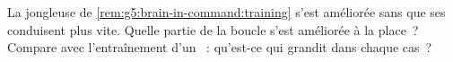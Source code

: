 \begin{exercise}[$\star\star\star$]\label{exo:g5:brain-in-command:11}
La jongleuse de \cref{rem:g5:brain-in-command:training} s'est
améliorée sans que ses  conduisent plus vite. Quelle partie de
la boucle s'est améliorée à la place~? Compare avec l'entraînement
d'un ~: qu'est-ce qui grandit dans chaque cas~?
\end{exercise}
